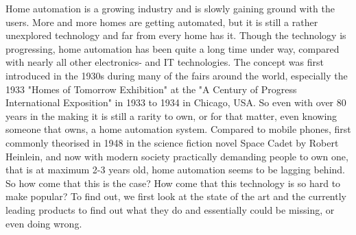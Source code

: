 Home automation is a growing industry and is slowly gaining ground with the users. More and more homes are getting automated, but it is still a rather unexplored technology and far from every home has it. Though the technology is progressing, home automation has been quite a long time under way, compared with nearly all other electronics- and IT technologies. The concept was first introduced in the 1930s during many of the fairs around the world, especially the 1933 "Homes of Tomorrow Exhibition" at the "A Century of Progress International Exposition" in 1933 to 1934 in Chicago, USA. So even with over 80 years in the making it is still a rarity to own, or for that matter, even knowing someone that owns, a home automation system. Compared to mobile phones, first commonly theorised in 1948 in the science fiction novel Space Cadet by Robert Heinlein, and now with modern society practically demanding people to own one, that is at maximum 2-3 years old, home automation seems to be lagging behind. So how come that this is the case? How come that this technology is so hard to make popular? To find out, we first look at the state of the art and the currently leading products to find out what they do and essentially could be missing, or even doing wrong.
